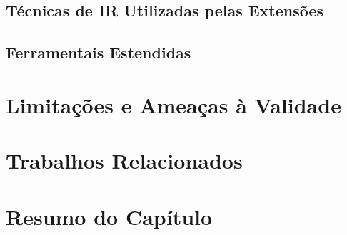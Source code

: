 \subsection{Técnicas de IR Utilizadas pelas Extensões}
\label{sub:técnicas_de_ir_utilizadaas_pelas_extensões}


\subsection{Ferramentais Estendidas}
\label{sub:ferrramentas_extendidas}


\section{Limitações e Ameaças à Validade}

\section{Trabalhos Relacionados}

\section{Resumo do Capítulo}